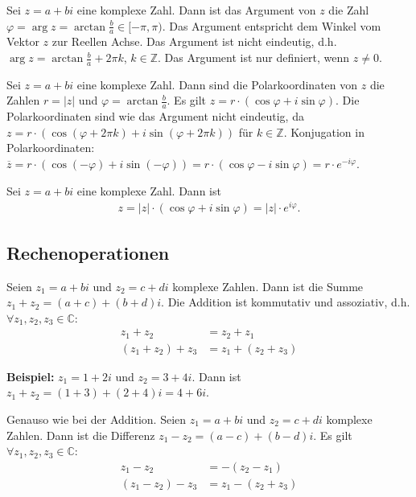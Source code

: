 \documentclass[12pt]{article}
\newcommand{\Z}{\mathbb{Z}}
\newcommand{\C}{\mathbb{C}}
\newenvironment{definition}[2][Definition]{\begin{trivlist}
        \item[\hskip \labelsep {\bfseries #1}\hskip \labelsep {\bfseries #2.}]}{\flushright{$\square$}\end{trivlist}}
\begin{document}
\begin{definition}{[Argument]}
        Sei $z=a+bi$ eine komplexe Zahl. Dann ist das Argument von $z$ die Zahl $\varphi=\arg{z}=\arctan{\frac{b}{a}}\in[-\pi,\pi)$. Das Argument entspricht dem Winkel vom Vektor $z$ zur Reellen Achse. Das Argument ist nicht eindeutig, d.h. $\arg{z}=\arctan{\frac{b}{a}}+2\pi k$, $k\in\Z$. Das Argument ist nur definiert, wenn $z\neq 0$.
\end{definition}

\begin{definition}{[Polarkoordinaten]}
        Sei $z=a+bi$ eine komplexe Zahl. Dann sind die Polarkoordinaten von $z$ die Zahlen $r=|z|$ und $\varphi=\arctan{\frac{b}{a}}$. Es gilt $z=r\cdot(\cos{\varphi}+i\sin{\varphi})$. Die Polarkoordinaten sind wie das Argument nicht eindeutig, da $z=r\cdot(\cos{(\varphi+2\pi k)}+i\sin{(\varphi+2\pi k)})$ für $k\in\Z$. Konjugation in Polarkoordinaten: $\overline{z}=r\cdot(\cos{(-\varphi)}+i\sin{(-\varphi)})=r\cdot(\cos{\varphi}-i\sin{\varphi})=r\cdot e^{-i\varphi}$.
\end{definition}

\begin{definition}{[Euler'sche Formel]}
        Sei $z=a+bi$ eine komplexe Zahl. Dann ist
        \begin{align*}
                z=|z|\cdot(\cos{\varphi}+i\sin{\varphi})=|z|\cdot e^{i\varphi}.
        \end{align*}
\end{definition}

\subsection{Rechenoperationen}

\begin{definition}{[Addition]}
        Seien $z_1=a+bi$ und $z_2=c+di$ komplexe Zahlen. Dann ist die Summe $z_1+z_2=(a+c)+(b+d)i$. Die Addition ist kommutativ und assoziativ, d.h. $\forall z_1,z_2,z_3\in\C$:
        \begin{align*}
                z_1+z_2       & =z_2+z_1       \\
                (z_1+z_2)+z_3 & =z_1+(z_2+z_3)
        \end{align*}

        \textbf{Beispiel:} $z_1=1+2i$ und $z_2=3+4i$. Dann ist $z_1+z_2=(1+3)+(2+4)i=4+6i$.
\end{definition}

\begin{definition}{[Subtraktion]}
        Genauso wie bei der Addition. Seien $z_1=a+bi$ und $z_2=c+di$ komplexe Zahlen. Dann ist die Differenz $z_1-z_2=(a-c)+(b-d)i$. Es gilt $\forall z_1,z_2,z_3\in\C$:
        \begin{align*}
                z_1-z_2       & =-(z_2-z_1)    \\
                (z_1-z_2)-z_3 & =z_1-(z_2+z_3)
        \end{align*}
\end{definition}
\end{document}

